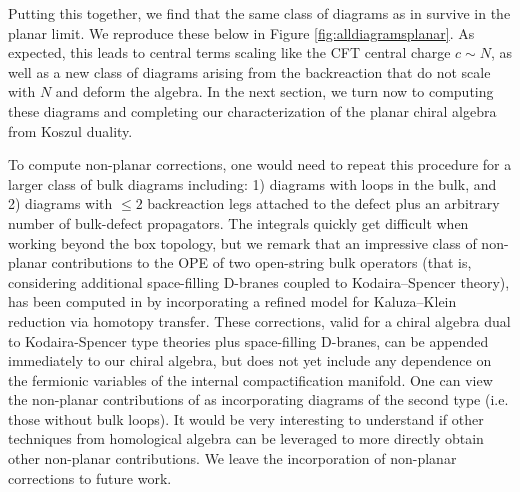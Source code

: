 \documentclass[../main.tex]{subfiles}
\begin{document}
Putting this together, we find that the same class of diagrams as in \cite{CP} survive in the planar limit. We reproduce these below in Figure \ref{fig:alldiagramsplanar}. As expected, this leads to central terms scaling like the CFT central charge $c \sim N$, as well as a new class of diagrams arising from the backreaction that do not scale with $N$ and deform the algebra. 
In the next section, we turn now to computing these diagrams and completing our characterization of the planar chiral algebra from Koszul duality. 

To compute non-planar corrections, one would need to repeat this procedure for a larger class of bulk diagrams including: 1) diagrams with loops in the bulk, and 2) diagrams with $\leq 2$ backreaction legs attached to the defect plus an arbitrary number of bulk-defect propagators. The integrals quickly get difficult when working beyond the box topology, but we remark that an impressive class of non-planar contributions to the OPE of two open-string bulk operators (that is, considering additional space-filling D-branes coupled to Kodaira--Spencer theory), has been computed in \cite{Keyou} by incorporating a refined model for Kaluza--Klein reduction via homotopy transfer.
These corrections, valid for a chiral algebra dual to Kodaira-Spencer type theories plus space-filling D-branes, can be appended immediately to our chiral algebra, but does not yet include any dependence on the fermionic variables of the internal compactification manifold. 
One can view the non-planar contributions of \cite{Keyou} as incorporating diagrams of the second type (i.e. those without bulk loops). 
It would be very interesting to understand if other techniques from homological algebra can be leveraged to more directly obtain other non-planar contributions. We leave the incorporation of non-planar corrections to future work.
\end{document}
